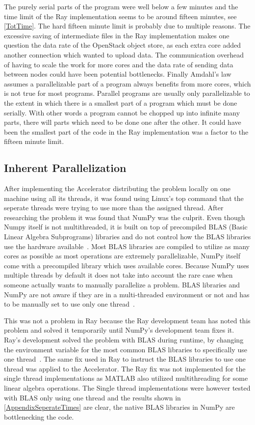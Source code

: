 \documentclass[12pt, a4paper]{article}
\begin{document}
The purely serial parts of the program were well below a few minutes and the time limit of the Ray implementation seems to be around fifteen minutes, see \cref{TotTime}.
The hard fifteen minute limit is probably due to multiple reasons.
The excessive saving of intermediate files in the Ray implementation makes one question the data rate of the OpenStack object store, as each extra core added another connection which wanted to upload data. 
The communication overhead of having to scale the work for more cores and the data rate of sending data between nodes could have been potential bottlenecks.
Finally Amdahl's law assumes a parallelizable part of a program always benefits from more cores, which is not true for most programs.
Parallel programs are usually only parallelizable to the extent in which there is a smallest part of a program which must be done serially.
With other words a program cannot be chopped up into infinite many parts, there will parts which need to be done one after the other.
It could have been the smallest part of the code in the Ray implementation was a factor to the fifteen minute limit.

\subsection{Inherent Parallelization}\label{inPara}

After implementing the Accelerator distributing the problem locally on one machine using all its threads, it was found using Linux's top command that the seperate threads were trying to use more than the assigned thread.
After researching the problem it was found that NumPy was the culprit.
Even though Numpy itself is not multithreaded, it is built on top of precompiled BLAS (Basic Linear Algebra Subprograms) libraries and do not control how the BLAS libraries use the hardware available~\cite{Numpy:OpenBLAS}.
Most BLAS libraries are compiled to utilize as many cores as possible as most operations are extremely parallelizable, NumPy itself come with a precompiled library which uses available cores.
Because NumPy uses multiple threads by default it does not take into account the rare case when someone actually wants to manually parallelize a problem. 
BLAS libraries and NumPy are not aware if they are in a multi-threaded environment or not and has to be manually set to use only one thread~\cite{OpenBLAS:threadSafe}.

This was not a problem in Ray because the Ray development team has noted this problem and solved it temporarily until NumPy's development team fixes it.
Ray's development solved the problem with BLAS during runtime, by changing the environment variable for the most common BLAS libraries to specifically use one thread~\cite{ray:OMPNUMTHREAD}. 
The same fix used in Ray to instruct the BLAS libraries to use one thread was applied to the Accelerator.
The Ray fix was not implemented for the single thread implementations as MATLAB also utilized multithreading for some linear algebra operations.
The Single thread implementations were however tested with BLAS only using one thread and the results shown in \cref{AppendixSeperateTimes} are clear, the native BLAS libraries in NumPy are bottlenecking the code.
\end{document}
